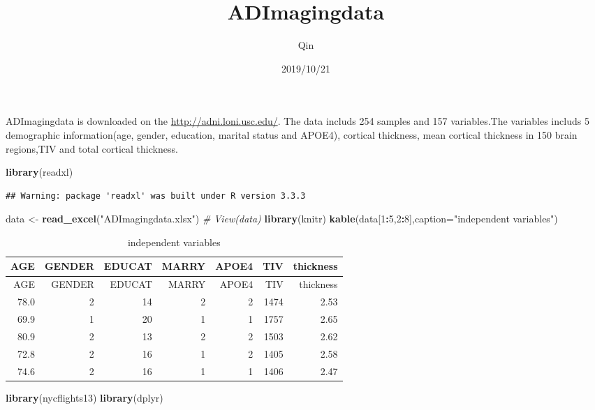 \documentclass[]{article}
\title{ADImagingdata}
\author{Qin}
\date{2019/10/21}
\newenvironment{Shaded}{\begin{snugshade}}{\end{snugshade}}
\newcommand{\CommentTok}[1]{\textcolor[rgb]{0.56,0.35,0.01}{\textit{#1}}}
\newcommand{\DataTypeTok}[1]{\textcolor[rgb]{0.13,0.29,0.53}{#1}}
\newcommand{\DecValTok}[1]{\textcolor[rgb]{0.00,0.00,0.81}{#1}}
\newcommand{\KeywordTok}[1]{\textcolor[rgb]{0.13,0.29,0.53}{\textbf{#1}}}
\newcommand{\NormalTok}[1]{#1}
\newcommand{\OperatorTok}[1]{\textcolor[rgb]{0.81,0.36,0.00}{\textbf{#1}}}
\newcommand{\StringTok}[1]{\textcolor[rgb]{0.31,0.60,0.02}{#1}}
\begin{document}
\maketitle

ADImagingdata is downloaded on the \url{http://adni.loni.usc.edu/}. The
data includs 254 samples and 157 variables.The variables includs 5
demographic information(age, gender, education, marital status and
APOE4), cortical thickness, mean cortical thickness in 150 brain
regions,TIV and total cortical thickness.

\begin{Shaded}
\begin{Highlighting}[]
\KeywordTok{library}\NormalTok{(readxl)}
\end{Highlighting}
\end{Shaded}

\begin{verbatim}
## Warning: package 'readxl' was built under R version 3.3.3
\end{verbatim}

\begin{Shaded}
\begin{Highlighting}[]
\NormalTok{data <-}\StringTok{ }\KeywordTok{read_excel}\NormalTok{(}\StringTok{"ADImagingdata.xlsx"}\NormalTok{)}
\CommentTok{# View(data)}
\KeywordTok{library}\NormalTok{(knitr)}
\KeywordTok{kable}\NormalTok{(data[}\DecValTok{1}\OperatorTok{:}\DecValTok{5}\NormalTok{,}\DecValTok{2}\OperatorTok{:}\DecValTok{8}\NormalTok{],}\DataTypeTok{caption=}\StringTok{"independent variables"}\NormalTok{)}
\end{Highlighting}
\end{Shaded}

\begin{longtable}[]{@{}rrrrrrr@{}}
\caption{independent variables}\tabularnewline
\toprule
AGE & GENDER & EDUCAT & MARRY & APOE4 & TIV & thickness\tabularnewline
\midrule
\endfirsthead
\toprule
AGE & GENDER & EDUCAT & MARRY & APOE4 & TIV & thickness\tabularnewline
\midrule
\endhead
78.0 & 2 & 14 & 2 & 2 & 1474 & 2.53\tabularnewline
69.9 & 1 & 20 & 1 & 1 & 1757 & 2.65\tabularnewline
80.9 & 2 & 13 & 2 & 2 & 1503 & 2.62\tabularnewline
72.8 & 2 & 16 & 1 & 2 & 1405 & 2.58\tabularnewline
74.6 & 2 & 16 & 1 & 1 & 1406 & 2.47\tabularnewline
\bottomrule
\end{longtable}

\begin{Shaded}
\begin{Highlighting}[]
\KeywordTok{library}\NormalTok{(nycflights13)}
\KeywordTok{library}\NormalTok{(dplyr)}
\end{Highlighting}
\end{Shaded}
\end{document}
